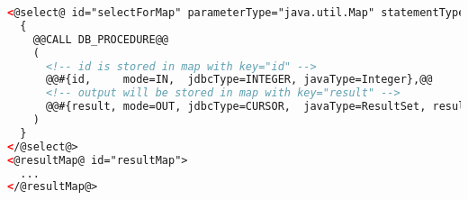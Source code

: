 
\begin{lstlisting}[language=XML, caption={Using \Code{Map} as argument for input and output}, label={code:mybatis:advanced:map}]
<@select@ id="selectForMap" parameterType="java.util.Map" statementType="CALLABLE">
  {
    @@CALL DB_PROCEDURE@@
    (
      <!-- id is stored in map with key="id" -->
      @@#{id,     mode=IN,  jdbcType=INTEGER, javaType=Integer},@@
      <!-- output will be stored in map with key="result" -->
      @@#{result, mode=OUT, jdbcType=CURSOR,  javaType=ResultSet, resultMap=resultMap}@@
    )
  }
</@select@>
<@resultMap@ id="resultMap">
  ...
</@resultMap@>
\end{lstlisting}
